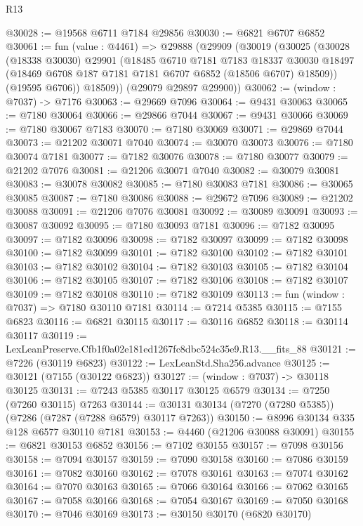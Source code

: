 \begin{lexlean}{R13}
\begin{coremodule}
@30028 := @19568 @6711 @7184 @29856
@30030 := @6821 @6707 @6852
@30061 := fun (value : @4461) =>
  @29888
    (@29909
      (@30019
        (@30025
          (@30028
            (@18338 @30030)
            @29901
            (@18485
              @6710
              @7181
              @7183
              @18337
              @30030
              @18497
              (@18469 @6708 @187 @7181 @7181 @6707 @6852 (@18506 @6707) @18509))
            (@19595 @6706))
          @18509))
      (@29079 @29897 @29900))
@30062 := (window : @7037) -> @7176
@30063 := @29669 @7096
@30064 := @9431 @30063
@30065 := @7180 @30064
@30066 := @29866 @7044
@30067 := @9431 @30066
@30069 := @7180 @30067 @7183
@30070 := @7180 @30069
@30071 := @29869 @7044
@30073 := @21202 @30071 @7040
@30074 := @30070 @30073
@30076 := @7180 @30074 @7181
@30077 := @7182 @30076
@30078 := @7180 @30077
@30079 := @21202 @7076
@30081 := @21206 @30071 @7040
@30082 := @30079 @30081
@30083 := @30078 @30082
@30085 := @7180 @30083 @7181
@30086 := @30065 @30085
@30087 := @7180 @30086
@30088 := @29672 @7096
@30089 := @21202 @30088
@30091 := @21206 @7076 @30081
@30092 := @30089 @30091
@30093 := @30087 @30092
@30095 := @7180 @30093 @7181
@30096 := @7182 @30095
@30097 := @7182 @30096
@30098 := @7182 @30097
@30099 := @7182 @30098
@30100 := @7182 @30099
@30101 := @7182 @30100
@30102 := @7182 @30101
@30103 := @7182 @30102
@30104 := @7182 @30103
@30105 := @7182 @30104
@30106 := @7182 @30105
@30107 := @7182 @30106
@30108 := @7182 @30107
@30109 := @7182 @30108
@30110 := @7182 @30109
@30113 := fun (window : @7037) => @7180 @30110 @7181
@30114 := @7214 @5385
@30115 := @7155 @6823
@30116 := @6821 @30115
@30117 := @30116 @6852
@30118 := @30114 @30117
@30119 := LexLeanPreserve.Cfb1f0a02e181ed1267fc8dbc524c35e9.R13.__fits_88
@30121 := @7226 (@30119 @6823)
@30122 := LexLeanStd.Sha256.advance
@30125 := @30121 (@7155 (@30122 @6823))
@30127 := (window : @7037) -> @30118 @30125
@30131 := @7243 @5385 @30117 @30125 @6579
@30134 := @7250 (@7260 @30115) @7263
@30144 := @30131 @30134 (@7270 (@7280 @5385)) (@7286 (@7287 (@7288 @6579) @30117 @7263))
@30150 := @8996 @30134 @335 @128 @6577 @30110 @7181
@30153 := @4460 (@21206 @30088 @30091)
@30155 := @6821 @30153 @6852
@30156 := @7102 @30155
@30157 := @7098 @30156
@30158 := @7094 @30157
@30159 := @7090 @30158
@30160 := @7086 @30159
@30161 := @7082 @30160
@30162 := @7078 @30161
@30163 := @7074 @30162
@30164 := @7070 @30163
@30165 := @7066 @30164
@30166 := @7062 @30165
@30167 := @7058 @30166
@30168 := @7054 @30167
@30169 := @7050 @30168
@30170 := @7046 @30169
@30173 := @30150 @30170 (@6820 @30170)

\end{coremodule}
\end{lexlean}

